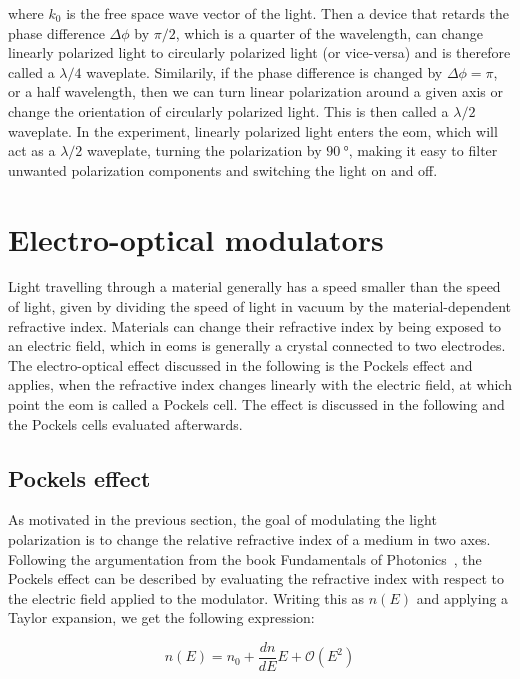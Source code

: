 where $k_0$ is the free space wave vector of the light. Then a device that retards the phase difference $\Delta \phi$ by $\pi/2$, which is a quarter of the wavelength, can change linearly polarized light to circularly polarized light (or vice-versa) and is therefore called a $\lambda / 4$ waveplate. Similarily, if the phase difference is changed by $\Delta \phi = \pi$, or a half wavelength, then we can turn linear polarization around a given axis or change the orientation of circularly polarized light. This is then called a $\lambda / 2$ waveplate. In the experiment, linearly polarized light enters the \ac{eom}, which will act as a $\lambda / 2$ waveplate, turning the polarization by $\SI{90}{\degree}$, making it easy to filter unwanted polarization components and switching the light on and off.

\section{Electro-optical modulators}%
\label{sec:eom}

Light travelling through a material generally has a speed smaller than the speed of light, given by dividing the speed of light in vacuum by the material-dependent refractive index. Materials can change their refractive index by being exposed to an electric field, which in \acp{eom} is generally a crystal connected to two electrodes. The electro-optical effect discussed in the following is the Pockels effect and applies, when the refractive index changes linearly with the electric field, at which point the \ac{eom} is called a Pockels cell. The effect is discussed in the following and the Pockels cells evaluated afterwards.

\subsection{Pockels effect}%
\label{sec:Pockels_effect}

As motivated in the previous section, the goal of modulating the light polarization is to change the relative refractive index of a medium in two axes. Following the argumentation from the book Fundamentals of Photonics~\cite{Saleh1991}, the Pockels effect can be described by evaluating the refractive index with respect to the electric field applied to the modulator. Writing this as $n(E)$ and applying a Taylor expansion, we get the following expression:

\begin{equation}
	n(E) = n_0 + \frac{dn}{dE} E + \mathcal{O}(E^2)
\end{equation}

